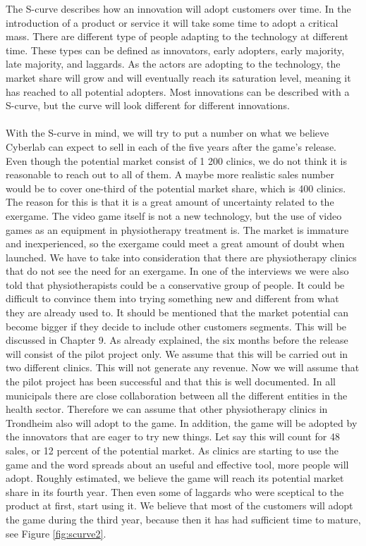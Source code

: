 The S-curve describes how an innovation will adopt customers over time. In the introduction of a product or service it will take some time to adopt a critical mass. There are different type of people adapting to the technology at different time. These types can be defined as innovators, early adopters, early majority, late majority, and laggards. As the actors are adopting to the technology, the market share will grow and will eventually reach its saturation level, meaning it has reached to all potential adopters. Most innovations can be described with a S-curve, but the curve will look different for different innovations\cite{scurve}.\\ \\
With the S-curve in mind, we will try to put a number on what we believe Cyberlab can expect to sell in each of the five years after the game’s release. Even though the potential market consist of 1 200 clinics, we do not think it is reasonable to reach out to all of them. A maybe more realistic sales number would be to cover one-third of the potential market share, which is 400 clinics. The reason for this is that it is a great amount of uncertainty related to the exergame. The video game itself is not a new technology, but the use of video games as an equipment in physiotherapy treatment is. The market is immature and inexperienced, so the exergame could meet a great amount of doubt when launched. We have to take into consideration that there are physiotherapy clinics that do not see the need for an exergame. In one of the interviews we were also told that physiotherapists could be a conservative group of people. It could be difficult to convince them into trying something new and different from what they are already used to. It should be mentioned that the market potential can become bigger if they decide to include other customers segments. This will be discussed in Chapter 9. As already explained, the six months before the release will consist of the pilot project only. We assume that this will be carried out in two different clinics. This will not generate any revenue. Now we will assume that the pilot project has been successful and that this is well documented. In all municipals there are close collaboration between all the different entities in the health sector. Therefore we can assume that other physiotherapy clinics in Trondheim also will adopt to the game. In addition, the game will be adopted by the innovators that are eager to try new things. Let say this will count for 48 sales, or 12 percent of the potential market. As clinics are starting to use the game and the word spreads about an useful and effective tool, more people will adopt. Roughly estimated, we believe the game will reach its potential market share in its fourth year. Then even some of laggards who were sceptical to the product at first, start using it. We believe that most of the customers will adopt the game during the third year, because then it has had sufficient time to mature, see Figure \ref{fig:scurve2}. \\ \\ 
